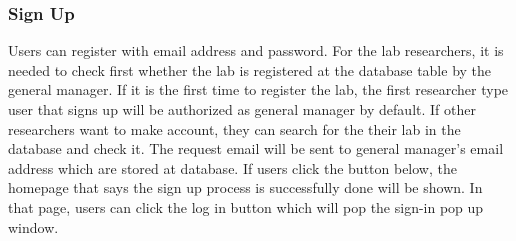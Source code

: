 \documentclass[letterpaper, 10 pt, conference]{ieeeconf}  %
\begin{document}
\subsubsection{Sign Up}
Users can register with email address and password. For the lab researchers, it is needed to check first whether the lab is registered at the database table by the general manager. If it is the first time to register the lab, the first researcher type user that signs up will be authorized as general manager by default. If other researchers want to make account, they can search for the their lab in the database and check it. The request email will be sent to general manager's email address which are stored at database. 
If users click the button below, the homepage that says the sign up process is successfully done will be shown. In that page, users can click the log in button which will pop the sign-in pop up window.
\end{document}
